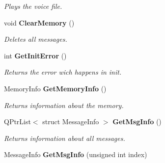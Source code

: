 \begin{CompactItemize}
\begin{CompactList}\small\item\em Plays the voice file. \item\end{CompactList}\item 
void {\bf Clear\-Memory} ()
\begin{CompactList}\small\item\em Deletes all messages. \item\end{CompactList}\item 
int {\bf Get\-Init\-Error} ()\label{classUsrSmpThread_a8}

\begin{CompactList}\small\item\em Returns the error wich happens in init. \item\end{CompactList}\item 
Memory\-Info {\bf Get\-Memory\-Info} ()\label{classUsrSmpThread_a9}

\begin{CompactList}\small\item\em Returns information about the memory. \item\end{CompactList}\item 
QPtr\-List$<$ struct Message\-Info $>$ {\bf Get\-Msg\-Info} ()\label{classUsrSmpThread_a10}

\begin{CompactList}\small\item\em Returns information about all messages. \item\end{CompactList}\item 
Message\-Info {\bf Get\-Msg\-Info} (unsigned int index)\label{classUsrSmpThread_a11}


\end{CompactItemize}
